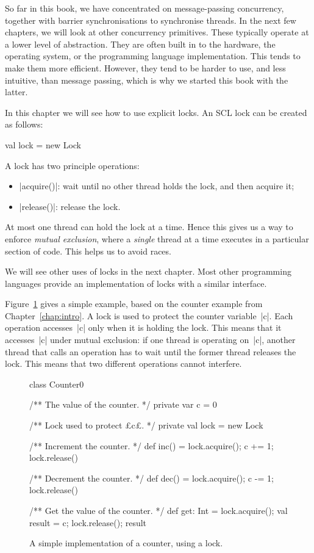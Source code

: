 So far in this book, we have concentrated on message-passing concurrency,
together with barrier synchronisations to synchronise threads.  In the next
few chapters, we will look at other concurrency primitives.  These typically
operate at a lower level of abstraction.  They are often built in to the
hardware, the operating system, or the programming language implementation.
This tends to make them more efficient.  However, they tend to be harder to
use, and less intuitive, than message passing, which is why we started this
book with the latter.

In this chapter we will see how to use explicit locks.  An SCL lock can be
created as follows:
%
\begin{scala}
  val lock = new Lock
\end{scala}

A lock has two principle operations:
%
\begin{itemize}
\item |acquire()|: wait until no other thread holds the lock, and then acquire
  it;

\item |release()|: release the lock.
\end{itemize}
%
At most one thread can hold the lock at a time.  Hence this gives us a way to
enforce \emph{mutual exclusion}, where a \emph{single} thread at a time
executes in a particular section of code.  This helps us to avoid races.

We will see other uses of locks in the next chapter. 
%
Most other programming languages provide an implementation of locks with a
similar interface.

Figure~\ref{fig:counter-lock0} gives a simple example, based on the counter
example from Chapter~\ref{chap:intro}.  A lock is used to protect the counter
variable~|c|.  Each operation accesses~|c| only when it is holding the lock.
This means that it accesses~|c| under mutual exclusion: if one thread is
operating on~|c|, another thread that calls an operation has to wait until the
former thread releases the lock.  This means that two different operations
cannot interfere.


\begin{figure}
\begin{scala}
class Counter0{
  /** The value of the counter. */
  private var c = 0

  /** Lock used to protect £c£. */
  private val lock = new Lock

  /** Increment the counter. */
  def inc() = { lock.acquire(); c += 1; lock.release() }

  /** Decrement the counter. */
  def dec() = { lock.acquire(); c -= 1; lock.release() }

  /** Get the value of the counter. */
  def get: Int = { lock.acquire(); val result = c; lock.release(); result }
}
\end{scala}
\caption{A simple implementation of a counter, using a lock.}
\label{fig:counter-lock0}
\end{figure}

